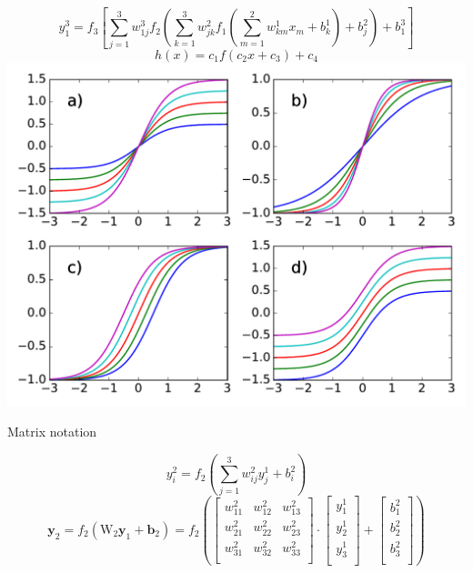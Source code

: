 \documentclass{beamer}
\begin{document}
\begin{frame}

\begin{equation*}
  y_1^3 = f_3\left[\sum_{j=1}^3 w_{1j}^3 f_2\left(\sum_{k=1}^3 w_{jk}^2 f_1\left(\sum_{m=1}^2 w_{km}^1 x_m + b_k^1\right) + b_j^2\right)
  + b_1^3\right]
\end{equation*}
\begin{equation*}
 h(x) = c_1 f(c_2 x + c_3) + c_4
\end{equation*}
\centering
\includegraphics[width = 0.7\linewidth]{../Figures/Theory/activationFlex.pdf}

\end{frame}
 
 
\begin{frame}{Matrix notation}

\begin{equation*}
  y_i^2 = f_2\left(\sum_{j=1}^3 w_{ij}^2 y_j^1 + b_i^2\right)
\end{equation*}
\begin{equation*}
 \mathbf{y}_2 = f_2(\mathrm{W}_2 \mathbf{y}_{1} + \mathbf{b}_{2}) = 
 f_2\left(\left[\begin{array}{ccc}
    w^2_{11} &w^2_{12} &w^2_{13} \\
    w^2_{21} &w^2_{22} &w^2_{23} \\
    w^2_{31} &w^2_{32} &w^2_{33} \\
    \end{array} \right] \cdot
    \left[\begin{array}{c}
           y^1_1 \\
           y^1_2 \\
           y^1_3 \\
          \end{array}\right] + 
    \left[\begin{array}{c}
           b^2_1 \\
           b^2_2 \\
           b^2_3 \\
          \end{array}\right]\right)
\end{equation*}

\end{frame}
\end{document}
